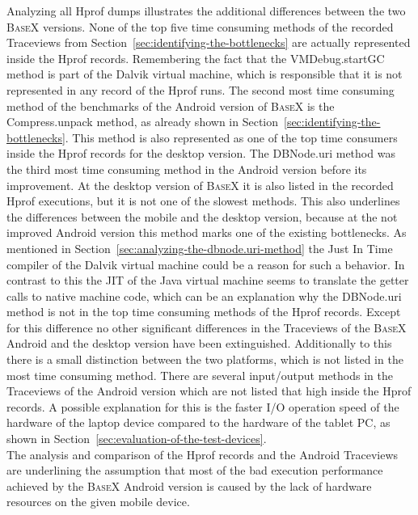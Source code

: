 Analyzing all Hprof dumps illustrates the additional differences between the two \textsc{BaseX} versions.
None of the top five time consuming methods of the recorded Traceviews from Section~\ref{sec:identifying-the-bottlenecks} are actually represented inside the Hprof records.
Remembering the fact that the \textsf{VMDebug.startGC} method is part of the Dalvik virtual machine, which is responsible that it is not represented in any record of the Hprof runs.
The second most time consuming method of the benchmarks of the Android version of \textsc{BaseX} is the \textsf{Compress.unpack} method, as already shown in Section~\ref{sec:identifying-the-bottlenecks}.
This method is also represented as one of the top time consumers inside the Hprof records for the desktop version.
The \textsf{DBNode.uri} method was the third most time consuming method in the Android version before its improvement.
At the desktop version of \textsc{BaseX} it is also listed in the recorded Hprof executions, but it is not one of the slowest methods.
This also underlines the differences between the mobile and the desktop version, because at the not improved Android version this method marks one of the existing bottlenecks.
As mentioned in Section~\ref{sec:analyzing-the-dbnode.uri-method} the Just In Time compiler of the Dalvik virtual machine could be a reason for such a behavior.
In contrast to this the JIT of the Java virtual machine seems to translate the getter calls to native machine code, which can be an explanation why the \textsf{DBNode.uri} method is not in the top time consuming methods of the Hprof records.
Except for this difference no other significant differences in the Traceviews of the \textsc{BaseX} Android and the desktop version have been extinguished.
Additionally to this there is a small distinction between the two platforms, which is not listed in the most time consuming method.
There are several input/output methods in the Traceviews of the Android version which are not listed that high inside the Hprof records.
A possible explanation for this is the faster I/O operation speed of the hardware of the laptop device compared to the hardware of the tablet PC, as shown in Section~\ref{sec:evaluation-of-the-test-devices}.\\
The analysis and comparison of the Hprof records and the Android Traceviews are underlining the assumption that most of the bad execution performance achieved by the \textsc{BaseX} Android version is caused by the lack of hardware resources on the given mobile device.




